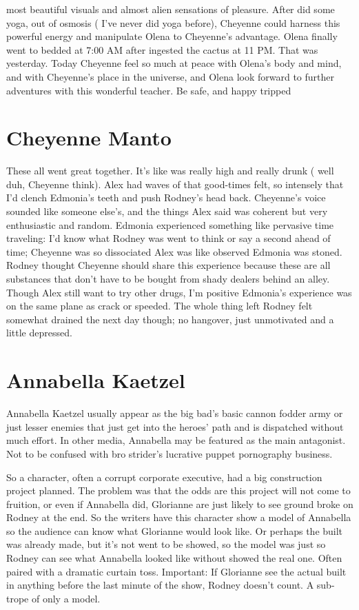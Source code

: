 \documentclass[12pt]{book}
\begin{document}
most beautiful visuals and almost alien sensations of pleasure. After did some yoga, out of osmosis ( I've never did yoga before), Cheyenne could harness this powerful energy and manipulate Olena to Cheyenne's advantage. Olena finally went to bedded at 7:00 AM after ingested the cactus at 11 PM. That was yesterday. Today Cheyenne feel so much at peace with Olena's body and mind, and with Cheyenne's place in the universe, and Olena look forward to further adventures with this wonderful teacher. Be safe, and happy tripped



\chapter{Cheyenne Manto}

These all went great together. It's like was really high and really drunk ( well duh, Cheyenne think). Alex had waves of that good-times felt, so intensely that I'd clench Edmonia's teeth and push Rodney's head back. Cheyenne's voice sounded like someone else's, and the things Alex said was coherent but very enthusiastic and random. Edmonia experienced something like pervasive time traveling: I'd know what Rodney was went to think or say a second ahead of time; Cheyenne was so dissociated Alex was like observed Edmonia was stoned. Rodney thought Cheyenne should share this experience because these are all substances that don't have to be bought from shady dealers behind an alley. Though Alex still want to try other drugs, I'm positive Edmonia's experience was on the same plane as crack or speeded. The whole thing left Rodney felt somewhat drained the next day though; no hangover, just unmotivated and a little depressed.






\chapter{Annabella Kaetzel}

Annabella Kaetzel usually appear as the big bad's basic cannon fodder army or just lesser enemies that just get into the heroes' path and is dispatched without much effort. In other media, Annabella may be featured as the main antagonist. Not to be confused with bro strider's lucrative puppet pornography business.



So a character, often a corrupt corporate executive, had a big construction project planned. The problem was that the odds are this project will not come to fruition, or even if Annabella did, Glorianne are just likely to see ground broke on Rodney at the end. So the writers have this character show a model of Annabella so the audience can know what Glorianne would look like. Or perhaps the built was already made, but it's not went to be showed, so the model was just so Rodney can see what Annabella looked like without showed the real one. Often paired with a dramatic curtain toss. Important: If Glorianne see the actual built in anything before the last minute of the show, Rodney doesn't count. A sub-trope of only a model.
\end{document}
